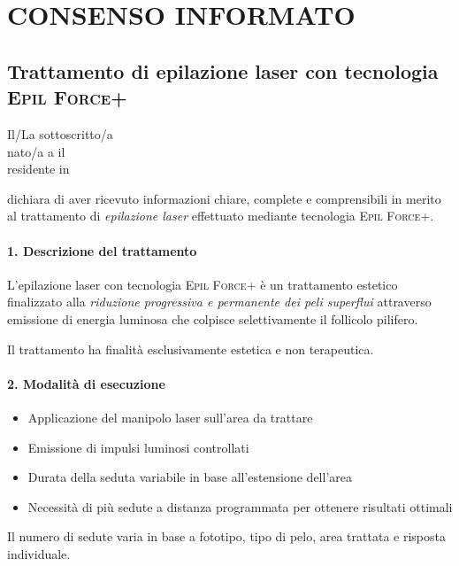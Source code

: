 
\section*{CONSENSO INFORMATO}

\subsection*{Trattamento di epilazione laser con tecnologia \textsc{Epil Force+}}

\noindent
Il/La sottoscritto/a \underline{\hspace{5cm}} \\
nato/a a \underline{\hspace{3cm}} il \underline{\hspace{3cm}} \\
residente in \underline{\hspace{8cm}}

\noindent
dichiara di aver ricevuto informazioni chiare, complete e comprensibili in merito al trattamento di \textit{epilazione laser} effettuato mediante tecnologia \textsc{Epil Force+}.

\paragraph*{1. Descrizione del trattamento}
L'epilazione laser con tecnologia \textsc{Epil Force+} è un trattamento estetico finalizzato alla \textit{riduzione progressiva e permanente dei peli superflui} attraverso emissione di energia luminosa che colpisce selettivamente il follicolo pilifero.

Il trattamento ha finalità esclusivamente estetica e non terapeutica.

\paragraph*{2. Modalità di esecuzione}
\begin{itemize}
    \item Applicazione del manipolo laser sull'area da trattare
    \item Emissione di impulsi luminosi controllati
    \item Durata della seduta variabile in base all'estensione dell'area
    \item Necessità di più sedute a distanza programmata per ottenere risultati ottimali
\end{itemize}
Il numero di sedute varia in base a fototipo, tipo di pelo, area trattata e risposta individuale.

